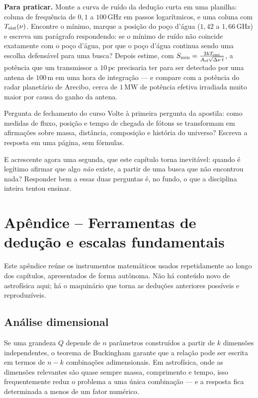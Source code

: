\documentclass[11pt,a4paper]{article}
\begin{document}
\textbf{Para praticar.} Monte a curva de ruído da dedução curta em uma planilha: coluna de frequência de $0{,}1$ a $100\,\mathrm{GHz}$ em passos logarítmicos, e uma coluna com $T_{\rm sist}(\nu)$. Encontre o mínimo, marque a posição do poço d'água ($1{,}42$ a $1{,}66\,\mathrm{GHz}$) e escreva um parágrafo respondendo: se o mínimo de ruído não coincide exatamente com o poço d'água, por que o poço d'água continua sendo uma escolha defensável para uma busca? Depois estime, com $S_{\rm min}=\frac{2kT_{\rm sist}}{A_{\rm ef}\sqrt{\Delta\nu\,t}}$, a potência que um transmissor a $10\,\mathrm{pc}$ precisaria ter para ser detectado por uma antena de $100\,\mathrm{m}$ em uma hora de integração --- e compare com a potência do radar planetário de Arecibo, cerca de $1\,\mathrm{MW}$ de potência efetiva irradiada muito maior por causa do ganho da antena.

\begin{lessonblock}{Pergunta de fechamento do curso}
Volte à primeira pergunta da apostila: como medidas de fluxo, posição e tempo de chegada de fótons se transformam em afirmações sobre massa, distância, composição e história do universo? Escreva a resposta em uma página, sem fórmulas.

E acrescente agora uma segunda, que este capítulo torna inevitável: quando é legítimo afirmar que algo \emph{não} existe, a partir de uma busca que não encontrou nada? Responder bem a essas duas perguntas é, no fundo, o que a disciplina inteira tentou ensinar.
\end{lessonblock}

\newpage
\section*{Apêndice -- Ferramentas de dedução e escalas fundamentais}
Este apêndice reúne os instrumentos matemáticos usados repetidamente ao longo dos capítulos, apresentados de forma autônoma. Não há conteúdo novo de astrofísica aqui; há o maquinário que torna as deduções anteriores possíveis e reproduzíveis.

\subsection*{Análise dimensional}

Se uma grandeza $Q$ depende de $n$ parâmetros construídos a partir de $k$ dimensões independentes, o teorema de Buckingham garante que a relação pode ser escrita em termos de $n-k$ combinações adimensionais. Em astrofísica, onde as dimensões relevantes são quase sempre massa, comprimento e tempo, isso frequentemente reduz o problema a uma única combinação --- e a resposta fica determinada a menos de um fator numérico.
\end{document}

